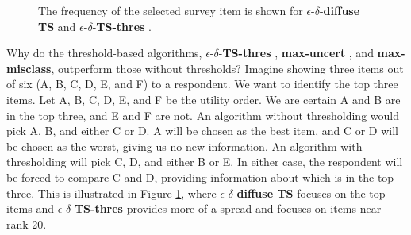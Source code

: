 \documentclass[a4paper,11pt]{article}
\newcommand{\mismin}{\textbf{max-misclass}}
\newcommand{\edts}{$\epsilon$-$\delta$-\textbf{diffuse TS} }
\newcommand{\edtsthres}{$\epsilon$-$\delta$-\textbf{TS-thres} }
\newcommand{\uncert}{\textbf{max-uncert} }
\begin{document}
\begin{figure}%
    \caption{The frequency of the selected survey item is shown for \edts and \edtsthres.}%
    \label{fig:Frequency}%
 	\begin{center}
    \qquad
	\end{center}
\end{figure}

Why do the threshold-based algorithms, \edtsthres, \uncert, and \mismin, outperform those without thresholds? Imagine showing three items out of six (A, B, C, D, E, and F) to a respondent. We want to identify the top three items. Let A, B, C, D, E, and F be the utility order. We are certain A and B are in the top three, and E and F are not. An algorithm without thresholding would pick A, B, and either C or D. A will be chosen as the best item, and C or D will be chosen as the worst, giving us no new information. An algorithm with thresholding will pick C, D, and either B or E. In either case, the respondent will be forced to compare C and D, providing information about which is in the top three. This is illustrated in Figure \ref{fig:Frequency}, where \edts focuses on the top items and \edtsthres provides more of a spread and focuses on items near rank 20.
\end{document}
